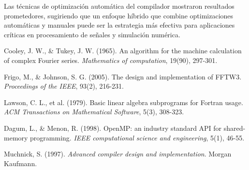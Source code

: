 \documentclass[a4paper]{article}
\begin{document}
Las técnicas de optimización automática del compilador mostraron resultados prometedores, sugiriendo que un enfoque híbrido que combine optimizaciones automáticas y manuales puede ser la estrategia más efectiva para aplicaciones críticas en procesamiento de señales y simulación numérica.

\begin{thebibliography}{9}
Cooley, J. W., \& Tukey, J. W. (1965). An algorithm for the machine calculation of complex Fourier series. \textit{Mathematics of computation}, 19(90), 297-301.

Frigo, M., \& Johnson, S. G. (2005). The design and implementation of FFTW3. \textit{Proceedings of the IEEE}, 93(2), 216-231.

Lawson, C. L., et al. (1979). Basic linear algebra subprograms for Fortran usage. \textit{ACM Transactions on Mathematical Software}, 5(3), 308-323.

Dagum, L., \& Menon, R. (1998). OpenMP: an industry standard API for shared-memory programming. \textit{IEEE computational science and engineering}, 5(1), 46-55.

Muchnick, S. (1997). \textit{Advanced compiler design and implementation}. Morgan Kaufmann.
\end{thebibliography}
\end{document}
